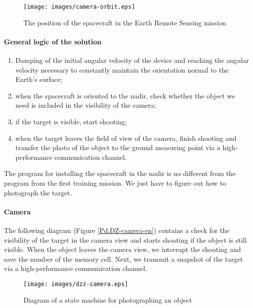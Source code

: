 \documentclass[12pt,a4paper]{article}
\begin{document}
\begin{figure}[tbh]
  \begin{center}
    \texttt{[image: images/camera-orbit.eps]}
    \caption{The position of the spacecraft in the Earth Remote Sensing mission}
    \label{Pic:Camera-DZZ-en}
  \end{center}
\end{figure}

\paragraph{General logic of the solution} 

\begin{enumerate}
\item Damping of the initial angular velocity of the device and reaching the angular velocity necessary to constantly maintain the orientation normal to the Earth's surface;
\item when the spacecraft is oriented to the nadir, check whether the object we need is included in the visibility of the camera;
\item if the target is visible, start shooting;
\item when the target leaves the field of view of the camera, finish shooting and transfer the photo of the object to the ground measuring point via a high-performance communication channel.
\end{enumerate}

The program for installing the spacecraft in the nadir is no different from the program from the first training mission. We just have to figure out how to photograph the target.

\paragraph{Camera} The following diagram (Figure \ref{Pd:DZ-camera-en}) contains a check for the visibility of the target in the camera view and starts shooting if the object is still visible. When the object leaves the camera view, we interrupt the shooting and save the number of the memory cell. Next, we transmit a snapshot of the target via a high-performance communication channel.

\begin{figure}[tbh]
  \begin{flushright}
    \texttt{[image: images/dzz-camera.eps]}
    \caption{Diagram of a state machine for photographing an object}
    \label{Pic:DZZ-camera-en}
  \end{flushright}
\end{figure}
\end{document}
